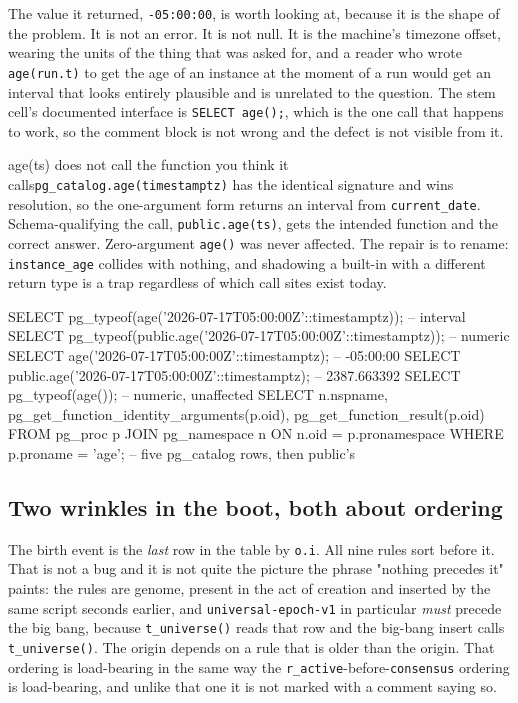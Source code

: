 The value it returned, \texttt{-05:00:00}, is worth looking at, because it is the shape of the problem. It is not an error. It is not null. It is the machine's timezone offset, wearing the units of the thing that was asked for, and a reader who wrote \texttt{age(run.t)} to get the age of an instance at the moment of a run would get an interval that looks entirely plausible and is unrelated to the question. The stem cell's documented interface is \texttt{SELECT age();}, which is the one call that happens to work, so the comment block is not wrong and the defect is not visible from it.

\begin{Correspondence}{age(ts) does not call the function you think it calls}{\texttt{pg\_catalog.age(timestamptz)} has the identical signature and wins resolution, so the one-argument form returns an interval from \texttt{current\_date}.}
Schema-qualifying the call, \texttt{public.age(ts)}, gets the intended function and the correct answer. Zero-argument \texttt{age()} was never affected. The repair is to rename: \texttt{instance\_age} collides with nothing, and shadowing a built-in with a different return type is a trap regardless of which call sites exist today.
\begin{Check}
SELECT pg_typeof(age('2026-07-17T05:00:00Z'::timestamptz));         -- interval
SELECT pg_typeof(public.age('2026-07-17T05:00:00Z'::timestamptz));  -- numeric
SELECT age('2026-07-17T05:00:00Z'::timestamptz);                    -- -05:00:00
SELECT public.age('2026-07-17T05:00:00Z'::timestamptz);             -- 2387.663392
SELECT pg_typeof(age());                                            -- numeric, unaffected
SELECT n.nspname, pg_get_function_identity_arguments(p.oid),
       pg_get_function_result(p.oid)
  FROM pg_proc p JOIN pg_namespace n ON n.oid = p.pronamespace
 WHERE p.proname = 'age';   -- five pg_catalog rows, then public's
\end{Check}
\end{Correspondence}

\subsection{Two wrinkles in the boot, both about ordering}

The birth event is the \emph{last} row in the table by \texttt{o.i}. All nine rules sort before it. That is not a bug and it is not quite the picture the phrase "nothing precedes it" paints: the rules are genome, present in the act of creation and inserted by the same script seconds earlier, and \texttt{universal-epoch-v1} in particular \emph{must} precede the big bang, because \texttt{t\_universe()} reads that row and the big-bang insert calls \texttt{t\_universe()}. The origin depends on a rule that is older than the origin. That ordering is load-bearing in the same way the \texttt{r\_active}-before-\texttt{consensus} ordering is load-bearing, and unlike that one it is not marked with a comment saying so.

